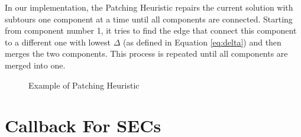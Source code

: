 In our implementation, the Patching Heuristic repairs the current solution with subtours one component at a time until all components are connected. 
Starting from component number 1, it tries to find the edge that connect this component to a different one with lowest $\Delta$ (as defined in Equation \ref{eq:delta}) and then merges the two components. This process is repeated until all components are merged into one.

\begin{figure}[!h]
    \centering
    \caption{Example of Patching Heuristic} \label{fig:patch}
\end{figure}




\section{Callback For SECs}

